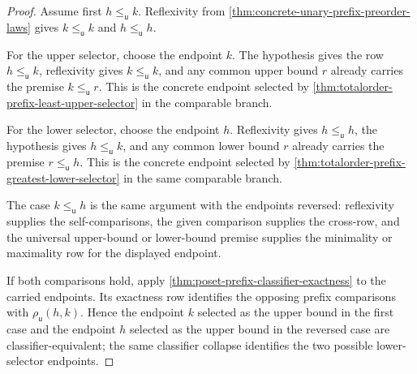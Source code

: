 \begin{proof}
Assume first $h\le_{\mathsf{u}}k$. Reflexivity from
\autoref{thm:concrete-unary-prefix-preorder-laws} gives
$k\le_{\mathsf{u}}k$ and $h\le_{\mathsf{u}}h$.

For the upper selector, choose the endpoint $k$. The hypothesis gives the row
$h\le_{\mathsf{u}}k$, reflexivity gives $k\le_{\mathsf{u}}k$, and any common
upper bound $r$ already carries the premise $k\le_{\mathsf{u}}r$. This is the
concrete endpoint selected by
\autoref{thm:totalorder-prefix-least-upper-selector} in the comparable branch.

For the lower selector, choose the endpoint $h$. Reflexivity gives
$h\le_{\mathsf{u}}h$, the hypothesis gives $h\le_{\mathsf{u}}k$, and any common
lower bound $r$ already carries the premise $r\le_{\mathsf{u}}h$. This is the
concrete endpoint selected by
\autoref{thm:totalorder-prefix-greatest-lower-selector} in the same comparable
branch.

The case $k\le_{\mathsf{u}}h$ is the same argument with the endpoints reversed:
reflexivity supplies the self-comparisons, the given comparison supplies the
cross-row, and the universal upper-bound or lower-bound premise supplies the
minimality or maximality row for the displayed endpoint.

If both comparisons hold, apply
\autoref{thm:poset-prefix-classifier-exactness} to the carried endpoints. Its
exactness row identifies the opposing prefix comparisons with
$\rho_{\mathsf{u}}(h,k)$. Hence the endpoint $k$ selected as the upper bound in
the first case and the endpoint $h$ selected as the upper bound in the reversed
case are classifier-equivalent; the same classifier collapse identifies the
two possible lower-selector endpoints.
\end{proof}

